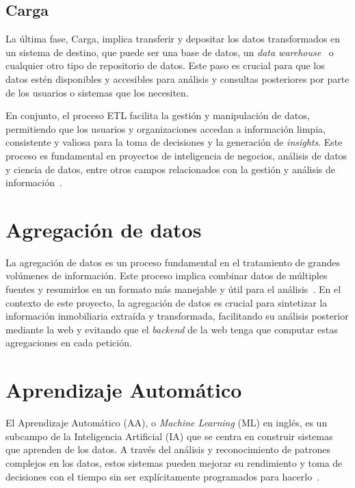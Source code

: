 \subsection{Carga}

La última fase, Carga, implica transferir y depositar los datos transformados en un sistema de destino, que puede ser una base de datos, un \textit{data warehouse}~\cite{dw1992} o cualquier otro tipo de repositorio de datos. Este paso es crucial para que los datos estén disponibles y accesibles para análisis y consultas posteriores por parte de los usuarios o sistemas que los necesiten.

En conjunto, el proceso ETL facilita la gestión y manipulación de datos, permitiendo que los usuarios y organizaciones accedan a información limpia, consistente y valiosa para la toma de decisiones y la generación de \textit{insights}. Este proceso es fundamental en proyectos de inteligencia de negocios, análisis de datos y ciencia de datos, entre otros campos relacionados con la gestión y análisis de información~\cite{aqlan2018}.

\section{Agregación de datos}

La agregación de datos es un proceso fundamental en el tratamiento de grandes volúmenes de información. Este proceso implica combinar datos de múltiples fuentes y resumirlos en un formato más manejable y útil para el análisis~\cite{cai2019}. En el contexto de este proyecto, la agregación de datos es crucial para sintetizar la información inmobiliaria extraída y transformada, facilitando su análisis posterior mediante la web y evitando que el \textit{backend} de la web tenga que computar estas agregaciones en cada petición.

\section{Aprendizaje Automático}

El Aprendizaje Automático (AA), o \textit{Machine Learning} (ML) en inglés, es un subcampo de la Inteligencia Artificial (IA) que se centra en construir sistemas que aprenden de los datos. A través del análisis y reconocimiento de patrones complejos en los datos, estos sistemas pueden mejorar su rendimiento y toma de decisiones con el tiempo sin ser explícitamente programados para hacerlo~\cite{mahesh2020}.

